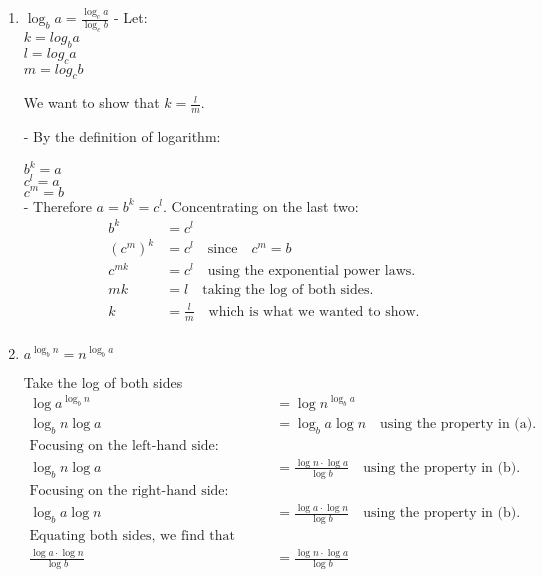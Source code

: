 \documentclass[11pt]{article}
\begin{document}
\begin{enumerate}
\begin{enumerate}
\item $\log_{b} a = \frac{\log_{c} a}{\log_{c} b}$
    - Let:\\
    $k=log_b a$\\
    $l=log_c a$\\
    $m=log_c b$
    
    We want to show that $k = \frac{l}{m}$.

    - By the definition of logarithm:
    
    $b^k=a$\\
    $c^l=a$\\
    $c^m=b$\\

    - Therefore $a=b^k=c^l$. Concentrating on the last two:
    \begin{align*}
        b^k&=c^l \\
        (c^m)^k &= c^l \quad \text{since} \quad c^m=b \\
        c^{mk} &= c^l \quad \text{using the exponential power laws.} \\ 
        mk &= l \quad \text{taking the log of both sides.} \\
        k &= \frac{l}{m} \quad \text{which is what we wanted to show.} \\
    \end{align*}


\item $a^{\log_{b} n} = n^{\log_{b} a}$

Take the log of both sides \\
\begin{align*}
    \log a^{\log_{b} n} &= \log n^{\log_{b} a} \\
    \log_{b} n \log a &= \log_{b} a \log n \quad \text{using the property in (a).}\\
    \text{Focusing on the left-hand side:} \\
    \log_{b} n \log a &= \frac{\log n \cdot \log a}{\log b} \quad \text{using the property in (b).}\\
    \text{Focusing on the right-hand side:} \\
    \log_{b} a \log n &= \frac{\log a \cdot \log n}{\log b} \quad \text{using the property in (b).}\\
    \text{Equating both sides, we find that they are equivalent} \\
    \frac{\log a \cdot \log n}{\log b} &= \frac{\log n \cdot \log a}{\log b}
\end{align*}

\end{enumerate}


\end{enumerate}
\end{document}
